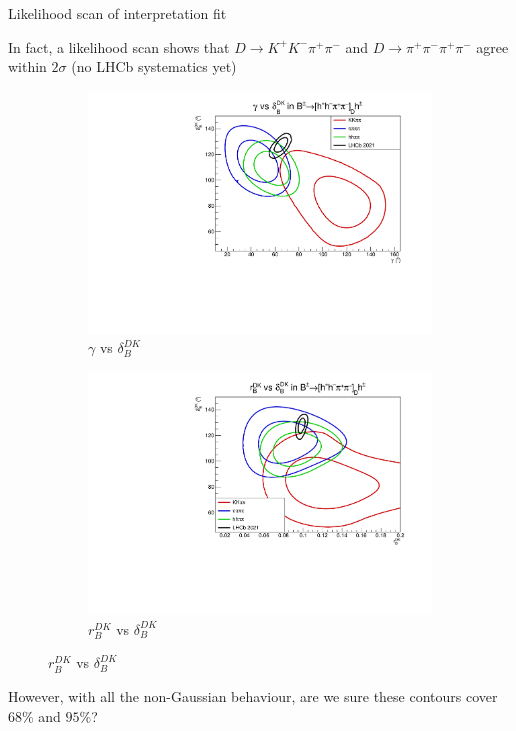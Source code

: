 \documentclass[xcolor={dvipsnames}]{beamer}
\begin{document}
\begin{frame}{Likelihood scan of interpretation fit}
  \begin{center}
    In fact, a likelihood scan shows that $D\to K^+K^-\pi^+\pi^-$ and $D\to\pi^+\pi^-\pi^+\pi^-$ agree within $2\sigma$ (no LHCb systematics yet)
  \end{center}
  \begin{figure}
    \centering
    \begin{subfigure}{0.50\textwidth}
      \centering
      \includegraphics[width=1.0\textwidth]{Plots/gamma_deltaB_hhpipi_LHCb_Prob_scan.pdf}
      \caption*{$\gamma$ vs $\delta_B^{DK}$}
    \end{subfigure}%
    \begin{subfigure}{0.50\textwidth}
      \centering
      \includegraphics[width=1.0\textwidth]{Plots/rB_deltaB_hhpipi_LHCb_Prob_scan.pdf}
      \caption*{$r_B^{DK}$ vs $\delta_B^{DK}$}
    \end{subfigure}
  \end{figure}
  \vspace{-0.3cm}
  \begin{center}
    However, with all the non-Gaussian behaviour, are we sure these contours cover $68\%$ and $95\%$\phantom{y}?
  \end{center}
\end{frame}
\end{document}
